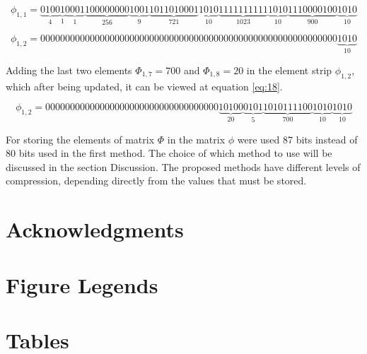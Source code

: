 \documentclass[10pt]{article}
\begin{document}
\begin{equation} \label{eq:16}
 \phi_{1,1} =
 \underbrace{0100}_{4}\underbrace{1}_{1}\underbrace{0001}_{1}\underbrace{100000000}_{256}\underbrace{1001}_{9}\underbrace{1011010001}_{721}\underbrace{1010}_{10}\underbrace{1111111111}_{1023}\underbrace{1010}_{10}\underbrace{1110000100}_{900}\underbrace{1010}_{10}
\end{equation}

\begin{equation} \label{eq:17}
 \phi_{1,2} = 000000000000000000000000000000000000000000000000000000000000\underbrace{1010}_{10}
\end{equation}

Adding the last two elements $\Phi_{1,7}=700$ and $\Phi_{1,8}=20$ in the element strip $\phi_{1,2}$, which after being updated, it can be viewed at equation \ref{eq:18}.

\begin{equation} \label{eq:18}
 \phi_{1,2} = 00000000000000000000000000000000000\underbrace{10100}_{20}\underbrace{0101}_{5}\underbrace{1010111100}_{700}\underbrace{1010}_{10}\underbrace{1010}_{10}
\end{equation}

For storing the elements of matrix $\Phi$ in the matrix $\phi$ were used 87 bits instead of 80 bits used in the first method. The choice of which method to use will be discussed in the section Discussion. The proposed methods have different levels of compression, depending directly from the values ​​that must be stored.

\section*{Acknowledgments}




\section*{Figure Legends}


\section*{Tables}
\end{document}
